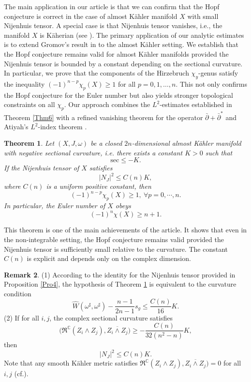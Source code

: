 \documentclass[12pt, twoside]{article}
\newtheorem{theorem}{Theorem}[section]
\theoremstyle{definition}
\newtheorem{remark}[theorem]{Remark}
\numberwithin{equation}{section}
\def \C {\mathbb{C}}
\def\w {\omega}
\begin{document}
The main application in our article is that we can confirm that the Hopf conjecture is correct in the case of almost K\"{a}hler manifold $X$ with small Nijenhuis tensor. A special case is that Nijenhuis tensor vanishes, i.e., the manifold $X$ is K\"{a}herian (see \cite{Gro}). The primary application of our analytic estimates is to extend Gromov's result in \cite{Gro} to the almost K\"ahler setting. We establish that the Hopf conjecture remains valid for almost K\"ahler manifolds provided the Nijenhuis tensor is bounded by a constant depending on the sectional curvature. In particular, we prove that the components of the Hirzebruch $\chi_{y}$-genus satisfy the inequality $(-1)^{n-p}\chi_{p}(X) \geq 1$ for all $p = 0, 1, \dots, n$. This not only confirms the Hopf conjecture for the Euler number but also yields stronger topological constraints on all $\chi_{p}$. Our approach combines the $L^{2}$-estimates established in Theorem \ref{Thm6} with a refined vanishing theorem for the operator $\bar{\partial}+\bar{\partial}^{\ast}$ and Atiyah's $L^{2}$-index theorem \cite{Ati}.
\begin{theorem}\label{Thm2}
	Let $(X,J,\w)$ be a closed $2n$-dimensional almost K\"{a}hler manifold with  negative sectional curvature, 
	i.e. there exists a constant $K>0$ such that
	$$\mathrm{sec}\leq -K.$$
	If the Nijenhuis tensor of $X$ satisfies
	\[|N_J|^{2}\leq C(n)K,\]
	where $C(n)$ is a uniform positive constant, then 	
	\begin{equation*}
	(-1)^{n-p}\chi_{p}(X)\geq1,\ \forall p=0,\cdots,n.
	\end{equation*}
	In particular, the Euler number of $X$ obeys
	\[(-1)^{n}\chi(X)\geq n+1.\]
\end{theorem}
This theorem is one of the main achievements of the article. It shows that even in the non-integrable setting, the Hopf conjecture remains valid provided the Nijenhuis tensor is sufficiently small relative to the curvature. The constant $C(n)$ is explicit and depends only on the complex dimension.
\begin{remark}
	(1) According to the identity for the Nijenhuis tensor  provided  in Proposition \ref{Pro4},  the hypothesis of Theorem \ref{Thm2} is equivalent to the curvature condition
	\[\hat{W}(\w^{\sharp},\w^{\sharp})-\frac{n-1}{2n-1}s_{g}\leq\frac{C(n)}{16}K.\]
	(2) If for all $i,j$, the complex sectional curvature satisfies
	\[
	\bigl(\mathfrak{R}^{\mathbb{C}}(Z_{i}\wedge Z_{j}),\overline{Z_{i}\wedge Z_{j}}\bigr) \geq -\frac{C(n)}{32(n^{2}-n)}K,
	\]
	then \[|N_{J}|^{2}\leq C(n)K .\] Note that any smooth Kähler metric satisfies  $\mathfrak{R}^{\C}(Z_{i}\wedge Z_{j}),\overline{Z_{i}\wedge Z_{j} })=0$ for all $i,j$ (cf.\cite{Her00}).
\end{remark}
\end{document}
